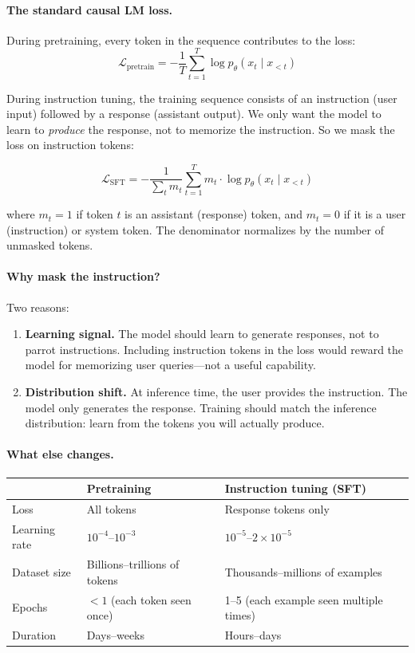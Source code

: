 \paragraph{The standard causal LM loss.} During pretraining, every token in the sequence contributes to the loss:
\[
\mathcal{L}_{\text{pretrain}} = -\frac{1}{T}\sum_{t=1}^{T} \log p_\theta(x_t \mid x_{<t})
\]

During instruction tuning, the training sequence consists of an instruction (user input) followed by a response (assistant output). We only want the model to learn to \emph{produce} the response, not to memorize the instruction. So we mask the loss on instruction tokens:

\[
\boxed{\mathcal{L}_{\text{SFT}} = -\frac{1}{\sum_t m_t}\sum_{t=1}^{T} m_t \cdot \log p_\theta(x_t \mid x_{<t})}
\]

where $m_t = 1$ if token $t$ is an assistant (response) token, and $m_t = 0$ if it is a user (instruction) or system token. The denominator normalizes by the number of unmasked tokens.

\paragraph{Why mask the instruction?} Two reasons:

\begin{enumerate}[nosep]
  \item \textbf{Learning signal.} The model should learn to generate responses, not to parrot instructions. Including instruction tokens in the loss would reward the model for memorizing user queries---not a useful capability.
  \item \textbf{Distribution shift.} At inference time, the user provides the instruction. The model only generates the response. Training should match the inference distribution: learn from the tokens you will actually produce.
\end{enumerate}

\paragraph{What else changes.}

\begin{center}
\begin{tabularx}{\textwidth}{@{}lXX@{}}
\toprule
& \textbf{Pretraining} & \textbf{Instruction tuning (SFT)} \\
\midrule
Loss & All tokens & Response tokens only \\
Learning rate & $10^{-4}$--$10^{-3}$ & $10^{-5}$--$2\times10^{-5}$ \\
Dataset size & Billions--trillions of tokens & Thousands--millions of examples \\
Epochs & $<1$ (each token seen once) & 1--5 (each example seen multiple times) \\
Duration & Days--weeks & Hours--days \\
\bottomrule
\end{tabularx}
\end{center}

